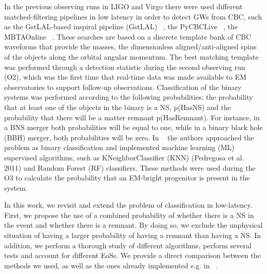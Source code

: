 
   
 
In the previous observing runs in LIGO and Virgo there were used different matched-filtering pipelines in low latency in order to detect GWs from CBC, such as the GstLAL-based inspiral pipeline (GstLAL) ~\cite{Sachdev:2020lfd}, the PyCBCLive ~\cite{Nitz_2018}, the MBTAOnline ~\cite{Adams_2016}. These searches are based on a discrete template bank of CBC waveforms that provide the masses, the dimensionless aligned/anti-aligned spins of the objects along the orbital angular momentum. The best matching template was performed through a detection statistic during the second observing run (O2), which was the first time that real-time data was made available to EM observatories to support follow-up observations. Classification of the binary systems was performed according to the following probabilities: the probability that at least one of the objects in the binary is a NS, p(HasNS) and the probability that there will be a matter remnant p(HasRemnant). For instance, in a BNS merger both probabilities will be equal to one, while in a binary black hole (BBH) merger, both probabilities will be zero. In ~\cite{Chatterjee:2019avs} the authors approached the problem as binary classification and implemented machine learning (ML) supervised algorithms, such as KNeighborClassifier (KNN) (Pedregosa et al. 2011) and Random Forest (RF) classifiers. These methods were used during the O3 to calculate the probability that an EM-bright progenitor is present in the system.


In this work, we revisit and extend the problem of classification in low-latency. First, we propose the use of a combined probability of whether there is a NS in the event and whether there is a remnant. By doing so, we exclude the unphysical situation of having a larger probability of having a remnant than having a NS. In addition, we perform a thorough study of different algorithms, perform several tests and account for different EoSs. We provide a direct comparison between the methods we used, as well as the ones already implemented e.g. in ~\cite{Chatterjee:2019avs}. 

